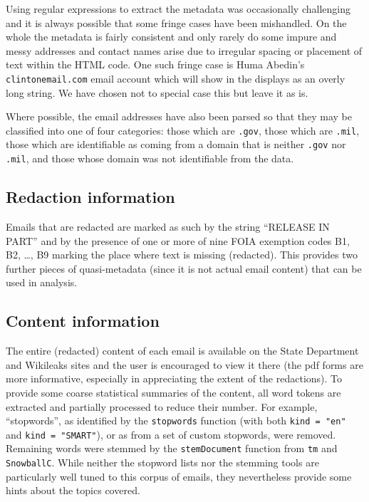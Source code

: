 \documentclass[journal]{vgtc}                %
\begin{document}
Using regular expressions to extract the metadata was occasionally challenging and it is always possible that some fringe cases have been mishandled.  On the whole the metadata is fairly consistent and only rarely do some impure and messy addresses and contact names arise  due to irregular spacing or placement of text within the HTML code.  One such fringe case is Huma Abedin's \texttt{clintonemail.com} email account which will show in the displays as an overly long string.  We have chosen not to special case this but leave it as is.

Where possible, the email addresses have also been parsed so that they may be classified into one of four categories: those which are \texttt{.gov},  those which are \texttt{.mil},  those which are identifiable as coming from a domain that is neither  \texttt{.gov} nor  \texttt{.mil}, and those whose domain was not identifiable from the data.
\subsection{Redaction information}
\label{sect:data:redact}
Emails that are redacted are marked as such by the string ``RELEASE IN PART'' and by the presence of one or more of nine FOIA exemption codes B1, B2, \ldots, B9  marking the place where text is missing (redacted).  This provides two further pieces of quasi-metadata (since it is not actual email content) that can be used in analysis.
\subsection{Content information}
\label{sect:data:contentinfo}
The entire (redacted) content of each email is available on the State Department and Wikileaks sites and the user is encouraged to view it there (the pdf forms are more informative, especially in appreciating the extent of the redactions).  To provide some coarse statistical summaries of the content, all word tokens are extracted and partially processed to reduce their number.  For example,  ``stopwords'', as identified by the \texttt{stopwords} function (with both  \texttt{kind = "en"} and  \texttt{kind = "SMART"}), or as from a set of custom stopwords, were removed.  Remaining words were stemmed by the \texttt{stemDocument} function from \texttt{tm} and \texttt{SnowballC}.   While neither the stopword lists nor the stemming tools are particularly well tuned to this corpus of emails, they nevertheless provide some hints about the topics covered.  
\end{document}
